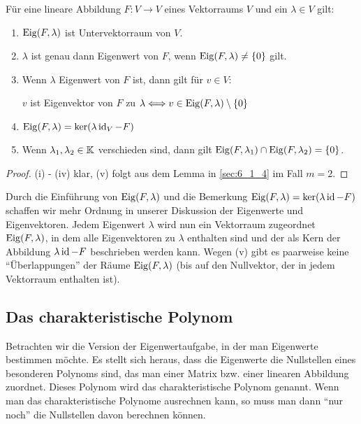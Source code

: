 \begin{propn}
	Für eine lineare Abbildung $F : V \to V$ eines Vektorraums $V$ und ein $\lambda \in V$ gilt: 
	\begin{enumerate}
		\item
			$ \operatorname{Eig}(F,\lambda) $ ist Untervektorraum von $ V $.
		\item
			$ \lambda $ ist genau dann Eigenwert von $ F $, wenn $ \operatorname{Eig}(F,\lambda) \neq \{ 0 \} $ gilt.
		\item
			Wenn $ \lambda $ Eigenwert von $ F $ ist, dann gilt für $ v \in V $:
			
			$ v $ ist Eigenvektor von $ F $ zu $ \lambda \Longleftrightarrow v \in \operatorname{Eig}(F,\lambda) \setminus \{ 0 \} $
		\item
			$ \operatorname{Eig}(F,\lambda) = \ker(\lambda \operatorname{id}_V - F) $
		\item
			Wenn $ \lambda_1, \lambda_2 \in \mathbb K $ verschieden sind, dann gilt $ \operatorname{Eig}(F,\lambda_1) \cap \operatorname{Eig}(F,\lambda_2) = \{ 0 \} $.
	\end{enumerate}
\end{propn}
\begin{proof}
	(i) - (iv) klar, (v) folgt aus dem Lemma in \ref{sec:6_1_4} im Fall $ m = 2 $.
\end{proof}

Durch die Einführung von $\operatorname{Eig}(F,\lambda)$ und die Bemerkung $\operatorname{Eig}(F,\lambda) = \ker(\lambda \operatorname{id} - F)$ schaffen wir mehr Ordnung in unserer Diskussion der Eigenwerte und Eigenvektoren. Jedem Eigenwert $\lambda$ wird nun ein Vektorraum zugeordnet $\operatorname{Eig}(F,\lambda)$, in dem alle Eigenvektoren zu $\lambda$ enthalten sind und der als Kern der Abbildung $\lambda \operatorname{id} - F$ beschrieben werden kann. Wegen (v) gibt es paarweise keine ``Überlappungen'' der Räume $\operatorname{Eig}(F,\lambda)$ (bis auf den Nullvektor, der in jedem Vektorraum enthalten ist). 

\clearpage
\subsection{Das charakteristische Polynom}

Betrachten wir die Version der Eigenwertaufgabe, in der man  Eigenwerte bestimmen möchte. Es stellt sich heraus, dass die Eigenwerte die Nullstellen eines besonderen Polynoms sind, das man einer Matrix bzw. einer linearen Abbildung zuordnet. Dieses Polynom wird das charakteristische Polynom genannt. Wenn man das charakteristische Polynome ausrechnen kann, so muss man dann ``nur noch'' die Nullstellen davon berechnen können. 

